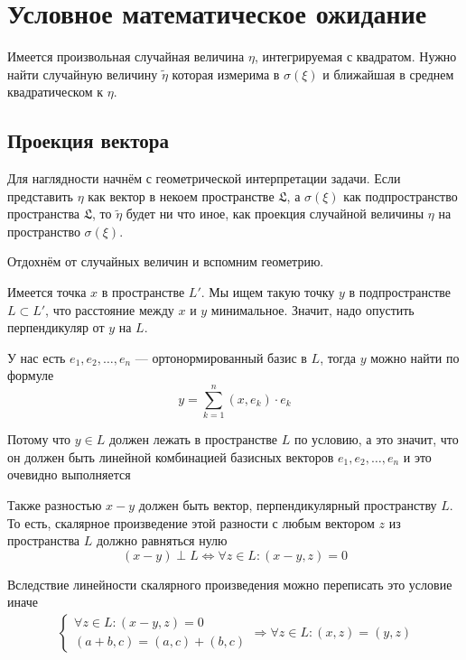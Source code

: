 \section{Условное математическое ожидание}
Имеется произвольная случайная величина $\eta$, интегрируемая с квадратом.
Нужно найти случайную величину $\tilde{\eta}$ которая
измерима в $\sigma\left( \xi \right)$
и ближайшая в среднем квадратическом к $\eta$.

\subsection{Проекция вектора}
Для наглядности начнём с геометрической интерпретации задачи.
Если представить $\eta$ как вектор в некоем пространстве $\mathfrak{L}$,
а $\sigma\left( \xi \right)$ как подпространство пространства $\mathfrak{L}$,
то $\tilde{\eta}$ будет ни что иное, как проекция случайной величины $\eta$
на пространство $\sigma\left( \xi \right)$.

Отдохнём от случайных величин и вспомним геометрию.

Имеется точка $x$ в пространстве $L'$.
Мы ищем такую точку $y$ в подпространстве $L\subset L'$,
что расстояние между $x$ и $y$ минимальное.
Значит, надо опустить перпендикуляр от $y$ на $L$.

У нас есть $e_1, e_2, \dots, e_n$ --- ортонормированный базис в $L$,
тогда $y$ можно найти по формуле
\begin{equation}\label{vectorProjection}
    y = \sum_{k=1}^n \left( x, e_k \right) \cdot e_k
\end{equation}

Потому что $y \in L$ должен лежать в пространстве $L$ по условию,
а это значит, что он должен быть линейной комбинацией базисных векторов
$e_1, e_2, \dots, e_n$ и это очевидно выполняется

Также разностью $x-y$ должен быть вектор, перпендикулярный пространству $L$.
То есть, скалярное произведение этой разности с любым вектором $z$
из пространства $L$ должно равняться нулю
$$\left( x-y \right) \perp L
    \Leftrightarrow \forall z \in L:
    \left( x-y,z \right)=0$$

Вследствие линейности скалярного произведения можно переписать это условие иначе
\begin{align*}
    \begin{cases}
        \forall z \in L: \left( x-y,z \right)=0\\
        \left( a+b,c \right)=\left( a,c \right)+\left( b,c \right)
    \end{cases}
    \Rightarrow \forall z \in L: \left( x,z \right)=\left( y,z \right)
\end{align*}

